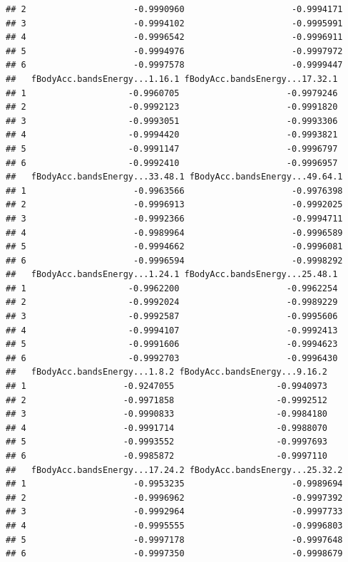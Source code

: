 \documentclass[
]{article}
\begin{document}
\begin{verbatim}
## 2                     -0.9990960                     -0.9994171
## 3                     -0.9994102                     -0.9995991
## 4                     -0.9996542                     -0.9996911
## 5                     -0.9994976                     -0.9997972
## 6                     -0.9997578                     -0.9999447
##   fBodyAcc.bandsEnergy...1.16.1 fBodyAcc.bandsEnergy...17.32.1
## 1                    -0.9960705                     -0.9979246
## 2                    -0.9992123                     -0.9991820
## 3                    -0.9993051                     -0.9993306
## 4                    -0.9994420                     -0.9993821
## 5                    -0.9991147                     -0.9996797
## 6                    -0.9992410                     -0.9996957
##   fBodyAcc.bandsEnergy...33.48.1 fBodyAcc.bandsEnergy...49.64.1
## 1                     -0.9963566                     -0.9976398
## 2                     -0.9996913                     -0.9992025
## 3                     -0.9992366                     -0.9994711
## 4                     -0.9989964                     -0.9996589
## 5                     -0.9994662                     -0.9996081
## 6                     -0.9996594                     -0.9998292
##   fBodyAcc.bandsEnergy...1.24.1 fBodyAcc.bandsEnergy...25.48.1
## 1                    -0.9962200                     -0.9962254
## 2                    -0.9992024                     -0.9989229
## 3                    -0.9992587                     -0.9995606
## 4                    -0.9994107                     -0.9992413
## 5                    -0.9991606                     -0.9994623
## 6                    -0.9992703                     -0.9996430
##   fBodyAcc.bandsEnergy...1.8.2 fBodyAcc.bandsEnergy...9.16.2
## 1                   -0.9247055                    -0.9940973
## 2                   -0.9971858                    -0.9992512
## 3                   -0.9990833                    -0.9984180
## 4                   -0.9991714                    -0.9988070
## 5                   -0.9993552                    -0.9997693
## 6                   -0.9985872                    -0.9997110
##   fBodyAcc.bandsEnergy...17.24.2 fBodyAcc.bandsEnergy...25.32.2
## 1                     -0.9953235                     -0.9989694
## 2                     -0.9996962                     -0.9997392
## 3                     -0.9992964                     -0.9997733
## 4                     -0.9995555                     -0.9996803
## 5                     -0.9997178                     -0.9997648
## 6                     -0.9997350                     -0.9998679

\end{verbatim}
\end{document}

